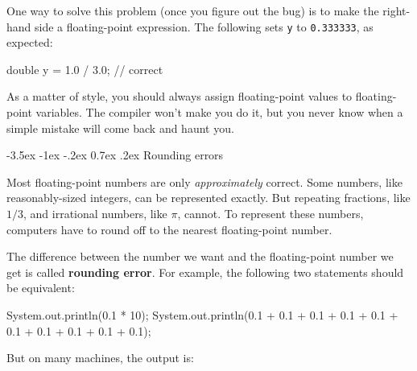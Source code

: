 \documentclass[12pt]{book}
\makeatletter
\theoremstyle{exercise}
\newcommand{\java}[1]{\verb"#1"}
\renewcommand{\section}{\@startsection{section}{1}{\z@}%
    {-3.5ex \@plus -1ex \@minus -.2ex}%
    {0.7ex \@plus.2ex}%
    {\normalfont\Large\bfseries}}
\newcommand{\java}[1]{\lstinline{#1}} %
\makeatother
\begin{document}
One way to solve this problem (once you figure out the bug) is to make the right-hand side a floating-point expression.
The following sets \java{y} to \java{0.333333}, as expected:

\begin{code}
    double y = 1.0 / 3.0;  // correct
\end{code}

As a matter of style, you should always assign floating-point values to floating-point variables.
The compiler won't make you do it, but you never know when a simple mistake will come back and haunt you.


\section{Rounding errors}



Most floating-point numbers are only {\it approximately} correct.
Some numbers, like reasonably-sized integers, can be represented exactly.
But repeating fractions, like $1/3$, and irrational numbers, like $\pi$, cannot.
To represent these numbers, computers have to round off to the nearest floating-point number.



The difference between the number we want and the floating-point number we get is called {\bf rounding error}.
For example, the following two statements should be equivalent:

\begin{code}
    System.out.println(0.1 * 10);
    System.out.println(0.1 + 0.1 + 0.1 + 0.1 + 0.1
                     + 0.1 + 0.1 + 0.1 + 0.1 + 0.1);
\end{code}

But on many machines, the output is:
\end{document}

